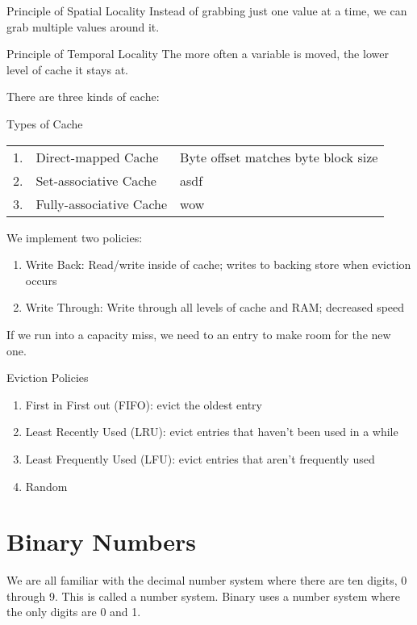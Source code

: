 \documentclass[12pt]{report}
\begin{document}
\begin{genbox}{Principle of Spatial Locality}
	Instead of grabbing just one value at a time, we can grab multiple values around it.
\end{genbox}

\begin{genbox}{Principle of Temporal Locality}
	The more often a variable is moved, the lower level of cache it stays at.
\end{genbox}

There are three kinds of cache:
\begin{genbox}{Types of Cache}
	\begin{tabularx}{\linewidth}{l l X}
		1. & Direct-mapped Cache & Byte offset matches byte block size \\
		2. & Set-associative Cache & asdf \\
		3. & Fully-associative Cache & wow
	\end{tabularx}
\end{genbox}


We implement two policies:
\begin{enumerate}
	\item Write Back: Read/write inside of cache; writes to backing store when eviction occurs
	\item Write Through: Write through all levels of cache and RAM; decreased speed
\end{enumerate}

If we run into a capacity miss, we need to  an entry to make room for the new one.
\begin{genbox}{Eviction Policies}
	\begin{enumerate}
		\item First in First out (FIFO): evict the oldest entry
		\item Least Recently Used (LRU): evict entries that haven't been used in a while
		\item Least Frequently Used (LFU): evict entries that aren't frequently used
		\item Random
	\end{enumerate}
\end{genbox}

\newpage
\chapter{Binary Numbers}
We are all familiar with the decimal number system where there are ten digits, 0 through 9. This is called a  number system. Binary uses a  number system where the only digits are 0 and 1.
\end{document}
